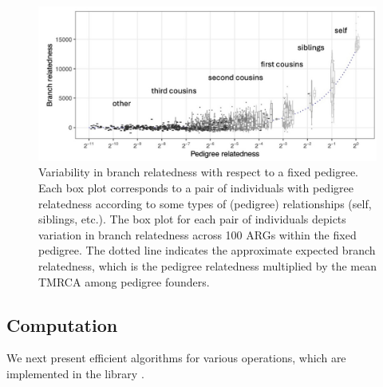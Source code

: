 \begin{figure}
    \centering
    \includegraphics[width=\textwidth]{Figures/Fig5_branch_recap_sim_boxplot_combined_behind2.jpg}
    \caption{Variability in branch relatedness with respect to a fixed pedigree.
    Each box plot corresponds to a pair of individuals with pedigree relatedness
    according to some types of (pedigree) relationships (self, siblings, etc.).
    The box plot for each pair of individuals depicts variation in branch relatedness across 100 ARGs within the fixed pedigree.
    The dotted line indicates the approximate expected branch relatedness,
    which is the pedigree relatedness multiplied by the mean TMRCA among pedigree founders.}
    \label{fig:boxplots}
\end{figure}



% 


\subsection{Computation}\label{subsec:matvec}

We next present efficient algorithms for various operations,
which are implemented in the \tskit{} library \citep{ralph2020efficiently, kelleher2024tskit}.

